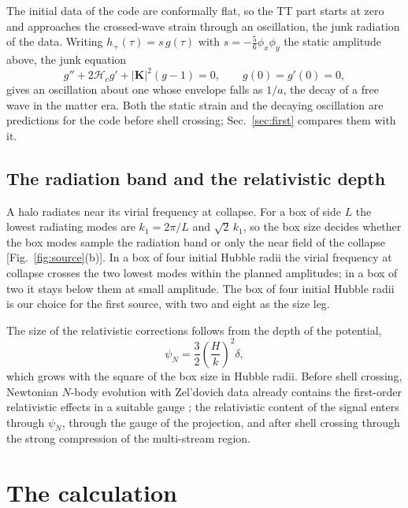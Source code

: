 \documentclass[aps,prd,twocolumn,10pt,superscriptaddress,nofootinbib,longbibliography,floatfix]{revtex4-2}
\newcommand{\Hc}{\mathcal{H}_c}
\begin{document}
The initial data of the code are conformally flat, so the TT part starts at zero and approaches the crossed-wave strain through an oscillation, the junk radiation of the data. Writing $h_+(\tau)=s\,g(\tau)$ with $s=-\tfrac56\phi_x\phi_y$ the static amplitude above, the junk equation
\begin{equation}\label{eq:junk}
g'' + 2\Hc g' + |\mathbf K|^2 (g-1) = 0,\qquad g(0)=g'(0)=0,
\end{equation}
gives an oscillation about one whose envelope falls as $1/a$, the decay of a free wave in the matter era. Both the static strain and the decaying oscillation are predictions for the code before shell crossing; Sec.~\ref{sec:first} compares them with it.

\subsection{The radiation band and the relativistic depth}\label{sec:band}

A halo radiates near its virial frequency at collapse. For a box of side $L$ the lowest radiating modes are $k_1=2\pi/L$ and $\sqrt2\,k_1$, so the box size decides whether the box modes sample the radiation band or only the near field of the collapse [Fig.~\ref{fig:source}(b)]. In a box of four initial Hubble radii the virial frequency at collapse crosses the two lowest modes within the planned amplitudes; in a box of two it stays below them at small amplitude. The box of four initial Hubble radii is our choice for the first source, with two and eight as the size leg.

The size of the relativistic corrections follows from the depth of the potential,
\begin{equation}\label{eq:depth}
\psi_N = \frac32\left(\frac{H}{k}\right)^2\delta,
\end{equation}
which grows with the square of the box size in Hubble radii. Before shell crossing, Newtonian $N$-body evolution with Zel'dovich data already contains the first-order relativistic effects in a suitable gauge \cite{Fidler:2015za}; the relativistic content of the signal enters through $\psi_N$, through the gauge of the projection, and after shell crossing through the strong compression of the multi-stream region.

\section{The calculation}\label{sec:setup}
\end{document}
